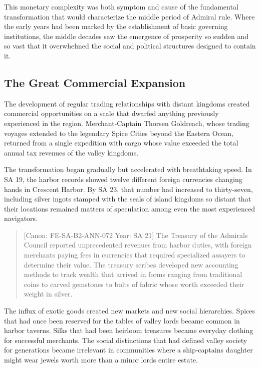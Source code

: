 This monetary complexity was both symptom and cause of the fundamental
transformation that would characterize the middle period of Admiral
rule. Where the early years had been marked by the establishment of
basic governing institutions, the middle decades saw the emergence of
prosperity so sudden and so vast that it overwhelmed the social and
political structures designed to contain it.

\subsection{The Great Commercial
Expansion}\label{the-great-commercial-expansion}

The development of regular trading relationships with distant kingdoms
created commercial opportunities on a scale that dwarfed anything
previously experienced in the region. Merchant-Captain Thorsen
Goldreach, whose trading voyages extended to the legendary Spice Cities
beyond the Eastern Ocean, returned from a single expedition with cargo
whose value exceeded the total annual tax revenues of the valley
kingdoms.

The transformation began gradually but accelerated with breathtaking
speed. In SA 19, the harbor records showed twelve different foreign
currencies changing hands in Crescent Harbor. By SA 23, that number had
increased to thirty-seven, including silver ingots stamped with the
seals of island kingdoms so distant that their locations remained
matters of speculation among even the most experienced navigators.

\begin{quote}
{[}Canon: FE-SA-B2-ANN-072 \textbar{} Year: SA 21{]} The Treasury of the
Admiral\textquotesingle s Council reported unprecedented revenues from
harbor duties, with foreign merchants paying fees in currencies that
required specialized assayers to determine their value. The treasury
scribes developed new accounting methods to track wealth that arrived in
forms ranging from traditional coins to carved gemstones to bolts of
fabric whose worth exceeded their weight in silver.
\end{quote}

The influx of exotic goods created new markets and new social
hierarchies. Spices that had once been reserved for the tables of valley
lords became common in harbor taverns. Silks that had been heirloom
treasures became everyday clothing for successful merchants. The social
distinctions that had defined valley society for generations became
irrelevant in communities where a ship-captain\textquotesingle s
daughter might wear jewels worth more than a minor
lord\textquotesingle s entire estate.

